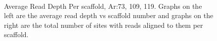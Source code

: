 \documentclass[../main.tex]{subfiles}
\begin{document}
\begin{figure}[H]
\begin{centering}
		\\
		\begin{singlespace}
			\vspace{-0.5cm}
			\caption[Average Read Depth Per scaffold, Ar:73, 109, 119]{Average Read Depth Per scaffold, Ar:73, 109, 119. Graphs on the left are the average read depth vs scaffold number and graphs on the right are the total number of sites with reads aligned to them per scaffold.}\label{avg_rd_graphs_1}
		\end{singlespace}
	\end{centering}
\end{figure}
\end{document}
